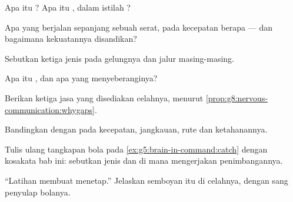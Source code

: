 \begin{exercise}[$\star$]\label{exo:g8:nervous-communication:1}
Apa itu ? Apa itu , dalam istilah ?
\end{exercise}

\begin{exercise}[$\star$]\label{exo:g8:nervous-communication:2}
Apa yang berjalan sepanjang sebuah serat, pada kecepatan
berapa --- dan bagaimana kekuatannya disandikan?
\end{exercise}

\begin{exercise}[$\star$]\label{exo:g8:nervous-communication:3}
Sebutkan ketiga jenis  pada gelungnya dan jalur
masing-masing.
\end{exercise}

\begin{exercise}[$\star$]\label{exo:g8:nervous-communication:4}
Apa itu , dan apa yang menyeberanginya?
\end{exercise}

\begin{exercise}[$\star$]\label{exo:g8:nervous-communication:5}
Berikan ketiga jasa yang disediakan celahnya, menurut
\cref{prop:g8:nervous-communication:whygaps}.
\end{exercise}

\begin{exercise}[$\star$]\label{exo:g8:nervous-communication:6}
Bandingkan  dengan  pada kecepatan, jangkauan,
rute dan ketahanannya.
\end{exercise}

\begin{exercise}[$\star\star$]\label{exo:g8:nervous-communication:7}
Tulis ulang tangkapan bola pada
\cref{ex:g5:brain-in-command:catch} dengan kosakata bab ini:
sebutkan jenis  dan di mana  mengerjakan
penimbangannya.
\end{exercise}

\begin{exercise}[$\star\star$]\label{exo:g8:nervous-communication:8}
``Latihan membuat menetap.'' Jelaskan semboyan itu di
celahnya, dengan sang penyulap bolanya.
\end{exercise}

